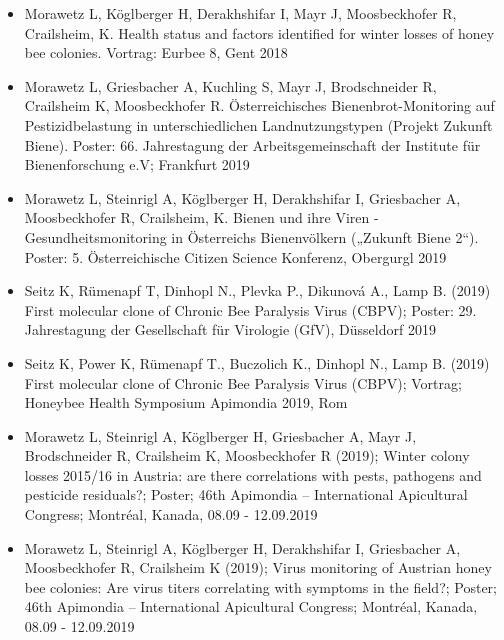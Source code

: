 \begin{itemize}

    \item 
    Morawetz L, Köglberger H, Derakhshifar I, Mayr J, Moosbeckhofer R, Crailsheim, K. Health status and factors identified for winter losses of honey bee colonies. Vortrag: Eurbee 8, Gent 2018
    
    \item 
    Morawetz L, Griesbacher A, Kuchling S, Mayr J, Brodschneider R, Crailsheim K, Moosbeckhofer R. Österreichisches Bienenbrot-Monitoring auf Pestizidbelastung in unterschiedlichen Landnutzungstypen (Projekt Zukunft Biene). Poster: 66. Jahrestagung der Arbeitsgemeinschaft der Institute für Bienenforschung e.V; Frankfurt 2019

    \item 
    Morawetz L, Steinrigl A, Köglberger H, Derakhshifar I, Griesbacher A, Moosbeckhofer R, Crailsheim, K. Bienen und ihre Viren - Gesundheitsmonitoring in Österreichs Bienenvölkern („Zukunft Biene 2“). Poster: 5. Österreichische Citizen Science Konferenz, Obergurgl 2019

    \item 
    Seitz K, Rümenapf T, Dinhopl N., Plevka P., Dikunová A., Lamp B. (2019) First molecular clone of Chronic Bee Paralysis Virus (CBPV); Poster: 29. Jahrestagung der Gesellschaft für Virologie (GfV), Düsseldorf 2019

    \item 
    Seitz K, Power K, Rümenapf T., Buczolich K., Dinhopl N., Lamp B. (2019) First molecular clone of Chronic Bee Paralysis Virus (CBPV); Vortrag; Honeybee Health Symposium Apimondia 2019, Rom
    
    \item
    Morawetz L, Steinrigl A, Köglberger H, Griesbacher A, Mayr J, Brodschneider R, Crailsheim K, Moosbeckhofer R (2019); Winter colony losses 2015/16 in Austria: are there correlations with pests, pathogens and pesticide residuals?; Poster; 46th Apimondia – International Apicultural Congress; Montréal, Kanada, 08.09 - 12.09.2019
    
    \item
    Morawetz L, Steinrigl A, Köglberger H, Derakhshifar I, Griesbacher A, Moosbeckhofer R, Crailsheim K (2019); Virus monitoring of Austrian honey bee colonies: Are virus titers correlating with symptoms in the field?; Poster; 46th Apimondia – International Apicultural Congress; Montréal, Kanada, 08.09 - 12.09.2019 

\end{itemize}


